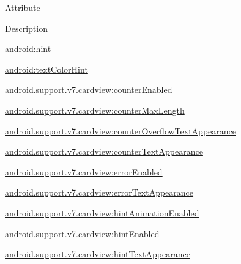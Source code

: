 Attribute

Description 

{\ttfamily \hyperlink{classandroid_1_1support_1_1v7_1_1cardview_1_1R_1_1styleable_a7c7f82a17bd73ea16f56f9302939809c}{android\+:hint}}

{\ttfamily \hyperlink{classandroid_1_1support_1_1v7_1_1cardview_1_1R_1_1styleable_ae336304acb8c72b2b3ccc0474f7aad40}{android\+:text\+Color\+Hint}}

{\ttfamily \hyperlink{classandroid_1_1support_1_1v7_1_1cardview_1_1R_1_1styleable_ad750dbff56b0a06f93dd6265ff2d59a8}{android.\+support.\+v7.\+cardview\+:counter\+Enabled}}

{\ttfamily \hyperlink{classandroid_1_1support_1_1v7_1_1cardview_1_1R_1_1styleable_a27208f96108863c14673fcbb37b76c90}{android.\+support.\+v7.\+cardview\+:counter\+Max\+Length}}

{\ttfamily \hyperlink{classandroid_1_1support_1_1v7_1_1cardview_1_1R_1_1styleable_a96e59cae084e4729e31f7abe43a12b5c}{android.\+support.\+v7.\+cardview\+:counter\+Overflow\+Text\+Appearance}}

{\ttfamily \hyperlink{classandroid_1_1support_1_1v7_1_1cardview_1_1R_1_1styleable_a4f48ef46d74bceb992c4f711156a4d5e}{android.\+support.\+v7.\+cardview\+:counter\+Text\+Appearance}}

{\ttfamily \hyperlink{classandroid_1_1support_1_1v7_1_1cardview_1_1R_1_1styleable_a8a5e8ed251b3ba0a1edc2d97db3fc83a}{android.\+support.\+v7.\+cardview\+:error\+Enabled}}

{\ttfamily \hyperlink{classandroid_1_1support_1_1v7_1_1cardview_1_1R_1_1styleable_a6a9888ab733b8f3bd68a7bcff9190d87}{android.\+support.\+v7.\+cardview\+:error\+Text\+Appearance}}

{\ttfamily \hyperlink{classandroid_1_1support_1_1v7_1_1cardview_1_1R_1_1styleable_a421879524a0afb79c7396b3d0a1e6e7e}{android.\+support.\+v7.\+cardview\+:hint\+Animation\+Enabled}}

{\ttfamily \hyperlink{classandroid_1_1support_1_1v7_1_1cardview_1_1R_1_1styleable_a5432983a645efe43960a479cb7a7fb22}{android.\+support.\+v7.\+cardview\+:hint\+Enabled}}

{\ttfamily \hyperlink{classandroid_1_1support_1_1v7_1_1cardview_1_1R_1_1styleable_a15aeb1e9b65b899047a6cf8619716946}{android.\+support.\+v7.\+cardview\+:hint\+Text\+Appearance}}

